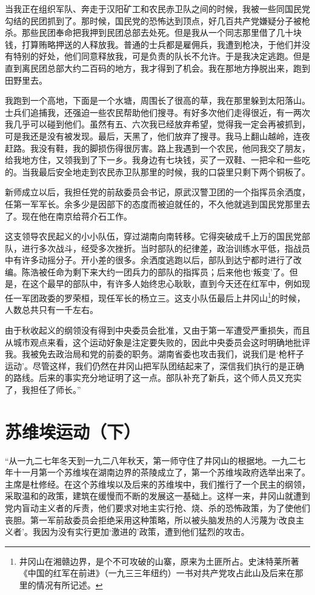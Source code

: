 \documentclass[10pt]{book}
\begin{document}
当我正在组织军队、奔走于汉阳矿工和农民赤卫队之间的时候，我被一些同国民党勾结的民团抓到了。那时候，国民党的恐怖达到顶点，好几百共产党嫌疑分子被枪杀。那些民团奉命把我押到民团总部去处死。但是我从一个同志那里借了几十块钱，打算贿略押送的人释放我。普通的士兵都是雇佣兵，我遭到枪决，于他们并没有特别的好处，他们同意释放我，可是负责的队长不允许。于是我决定逃跑。但是直到离民团总部大约二百码的地方，我才得到了机会。我在那地方挣脱出来，跑到田野里去。

我跑到一个高地，下面是一个水塘，周围长了很高的草，我在那里躲到太阳落山。士兵们追捕我，还强迫一些农民帮助他们搜寻。有好多次他们走得很近，有一两次我几乎可以碰到他们。虽然有五、六次我已经放弃希望，觉得我一定会再被抓到，可是我还是没有被发现。最后，天黑了，他们放弃了搜寻。我马上翻山越岭，连夜赶路。我没有鞋，我的脚损伤得很厉害。路上我遇到一个农民，他同我交了朋友，给我地方住，又领我到了下一乡。我身边有七块钱，买了一双鞋、一把伞和一些吃的。当我最后安全地走到农民赤卫队那里的时候，我的口袋里只剩下两个铜板了。

新师成立以后，我担任党的前敌委员会书记，原武汉警卫团的一个指挥员余洒度，任第一军军长。余多少是因部下的态度而被迫就任的，不久他就逃到国民党那里去了。现在他在南京给蒋介石工作。

这支领导农民起义的小小队伍，穿过湖南向南转移。它得突破成千上万的国民党部队，进行多次战斗，经受多次挫折。当时部队的纪律差，政治训练水平低，指战员中有许多动摇分子。开小差的很多。余洒度逃跑以后，部队到达宁都时进行了改编。陈浩被任命为剩下来大约一团兵力的部队的指挥员；后来他也‘叛变’了。但是，在这个最早的部队中，有许多人始终忠心耿耿，直到今天还在红军中，例如现任一军团政委的罗荣桓，现任军长的杨立三。这支小队伍最后上井冈山\footnote{井冈山在湘赣边界，是个不可攻破的山寨，原来为土匪所占。史沫特莱所著《中国的红军在前进》（一九三三年纽约）一书对共产党攻占此山及后来在那里的情况有所记述。}的时候，人数总共只有一千左右。

由于秋收起义的纲领没有得到中央委员会批准，又由于第一军遭受严重损失，而且从城市观点来看，这个运动好象是注定要失败的，因此中央委员会这时明确地批评我。我被免去政治局和党的前委的职务。湖南省委也攻击我们，说我们是‘枪杆子运动’。尽管这样，我们仍然在井冈山把军队团结起来了，深信我们执行的是正确的路线。后来的事实充分地证明了这一点。部队补充了新兵，这个师人员又充实了，我担任了师长。”



\section{苏维埃运动（下）}

“从一九二七年冬天到一九二八年秋天，第一师守住了井冈山的根据地。一九二七年十一月第一个苏维埃在湖南边界的茶陵成立了，第一个苏维埃政府选举出来了。主席是杜修经。在这个苏维埃以及后来的苏维埃中，我们推行了一个民主的纲领，采取温和的政策，建筑在缓慢而不断的发展这一基础上。这样一来，井冈山就遭到党内盲动主义者的斥责，他们要求对地主实行抢、烧、杀的恐怖政策，为了使他们丧胆。第一军前敌委员会拒绝采用这种策略，所以被头脑发热的人污蔑为‘改良主义者’。我因为没有实行更加‘激进的’政策，遭到他们猛烈的攻击。
\end{document}
